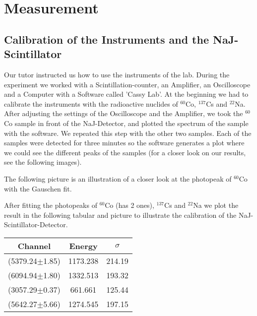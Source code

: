 \section{Measurement}

\subsection{Calibration of the Instruments and the NaJ-Scintillator}
Our tutor instructed us how to use the instruments of the lab. During the experiment we worked with a Scintillation-counter, an Amplifier, an Oscilloscope and a Computer with a Software called 'Cassy Lab'. At the beginning we had to calibrate the instruments with the radioactive nuclides of $^{60}$Co, $^{137}$Cs and $^{22}$Na. After adjusting the settings of the Oscilloscope and the Amplifier, we took the $^{60}$Co sample in front of the NaJ-Detector, and plotted the spectrum of the sample with the software. We repeated this step with the other two samples. Each of the samples were detected for three minutes so the software generates a plot where we could see the different peaks of the samples (for a closer look on our results, see the following images).


The following picture is an illustration of a closer look at the photopeak of $^{60}$Co with the Gauschen fit.


After fitting the photopeaks of $^{60}$Co (has 2 ones), $^{137}$Cs and $^{22}$Na we plot the result in the following tabular and picture to illustrate the calibration of the NaJ-Scintillator-Detector.

\begin{center}
\begin{tabular}{c|c|c}
Channel & Energy & $\sigma$\\
\hline
(5379.24$\pm$1.85)& 1173.238 & 214.19\\
(6094.94$\pm$1.80) & 1332.513 &  193.32\\	
(3057.29$\pm$0.37) & 661.661 & 125.44\\
(5642.27$\pm$5.66) & 1274.545 & 197.15\\
\end{tabular}
\end{center}


